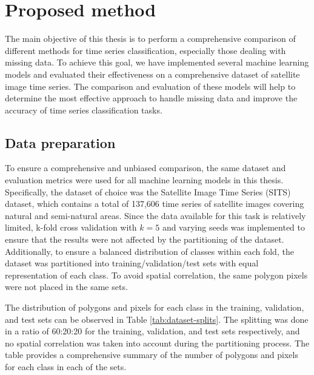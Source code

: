 \chapter{Proposed method}


The main objective of this thesis is to perform a comprehensive comparison of different methods for time series classification, especially those dealing with missing data.
To achieve this goal, we have implemented several machine learning models and evaluated their effectiveness on a comprehensive dataset of satellite image time series.
The comparison and evaluation of these models will help to determine the most effective approach to handle missing data and improve the accuracy of time series classification tasks.


\section{Data preparation}

To ensure a comprehensive and unbiased comparison, the same dataset and evaluation metrics were used for all machine learning models in this thesis. 
Specifically, the dataset of choice was the Satellite Image Time Series (SITS) dataset, which contains a total of 137,606 time series of satellite images covering natural and semi-natural areas. 
Since the data available for this task is relatively limited, k-fold cross validation with $k=5$ and varying seeds was implemented to ensure that the results were not affected by the partitioning of the dataset. Additionally, to ensure a balanced distribution of classes within each fold, the dataset was partitioned into training/validation/test sets with equal representation of each class. 
To avoid spatial correlation, the same polygon pixels were not placed in the same sets.

The distribution of polygons and pixels for each class in the training, validation, and test sets can be observed in Table \ref{tab:dataset-splits}.
The splitting was done in a ratio of 60:20:20 for the training, validation, and test sets respectively, and no spatial correlation was taken into account during the partitioning process.
The table provides a comprehensive summary of the number of polygons and pixels for each class in each of the sets.

